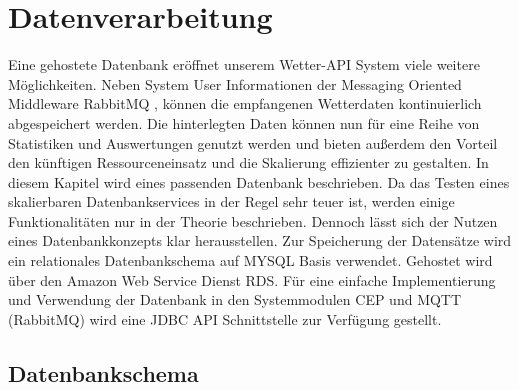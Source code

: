 \section{Datenverarbeitung}\label{db}

Eine gehostete Datenbank eröffnet unserem Wetter-API System viele weitere Möglichkeiten. Neben System User Informationen der Messaging Oriented Middleware RabbitMQ ,  können die empfangenen Wetterdaten kontinuierlich abgespeichert werden. Die hinterlegten Daten können nun für eine Reihe von Statistiken und Auswertungen genutzt werden und bieten außerdem den Vorteil  den künftigen Ressourceneinsatz und die Skalierung effizienter zu gestalten. 
In diesem Kapitel wird eines passenden Datenbank  beschrieben. Da das Testen eines skalierbaren Datenbankservices in der Regel sehr teuer ist, werden einige Funktionalitäten nur in der Theorie beschrieben. Dennoch lässt sich der Nutzen eines Datenbankkonzepts klar herausstellen.
Zur Speicherung der Datensätze wird ein relationales Datenbankschema auf MYSQL Basis verwendet. Gehostet wird über den Amazon Web Service Dienst RDS. Für eine einfache Implementierung und Verwendung der Datenbank in den Systemmodulen CEP und MQTT (RabbitMQ) wird eine JDBC API Schnittstelle zur Verfügung gestellt.

\subsection{Datenbankschema}

